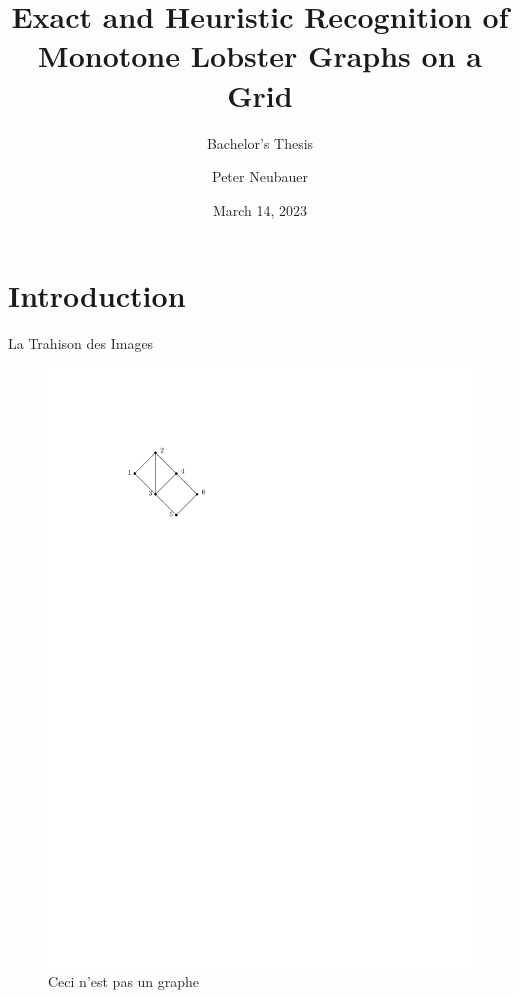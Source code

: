 \documentclass[aspectratio=169,notes]{beamer}
\title{Exact and Heuristic Recognition of\\Monotone Lobster Graphs on a Grid}
\subtitle{Bachelor's Thesis}
\author[P. Neubauer]{Peter Neubauer}
\institute[TU Wien]{TU Wien, Vienna, Austria}
\date{March 14, 2023}
\begin{document}
\begin{frame}
  \titlepage
\end{frame}      


\section{Introduction}


\begin{frame}{La Trahison des Images}

\begin{figure}
    \centering
    \includegraphics{ch1_introduction_1.pdf}
    \caption*{\selectfont Ceci n'est pas un graphe}
\end{figure}

\end{frame}
\end{document}
